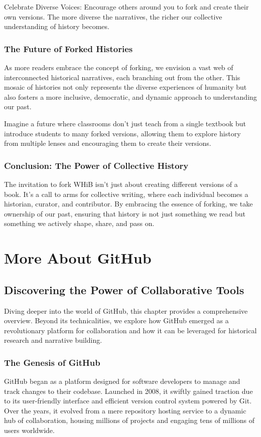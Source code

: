 \documentclass[a4paper,12pt]{book}
\begin{document}
Celebrate Diverse Voices: Encourage others around you to fork and create their own versions. The more diverse the narratives, the richer our collective understanding of history becomes.

\subsection*{The Future of Forked Histories}

As more readers embrace the concept of forking, we envision a vast web of interconnected historical narratives, each branching out from the other. This mosaic of histories not only represents the diverse experiences of humanity but also fosters a more inclusive, democratic, and dynamic approach to understanding our past.

Imagine a future where classrooms don't just teach from a single textbook but introduce students to many forked versions, allowing them to explore history from multiple lenses and encouraging them to create their versions.

\subsection*{Conclusion: The Power of Collective History}

The invitation to fork WHiB isn't just about creating different versions of a book. It's a call to arms for collective writing, where each individual becomes a historian, curator, and contributor. By embracing the essence of forking, we take ownership of our past, ensuring that history is not just something we read but something we actively shape, share, and pass on.

\chapter{More About GitHub}
\section*{Discovering the Power of Collaborative Tools}
Diving deeper into the world of GitHub, this chapter provides a comprehensive overview. Beyond its technicalities, we explore how GitHub emerged as a revolutionary platform for collaboration and how it can be leveraged for historical research and narrative building.

\subsection*{The Genesis of GitHub}
GitHub began as a platform designed for software developers to manage and track changes to their codebase. Launched in 2008, it swiftly gained traction due to its user-friendly interface and efficient version control system powered by Git. Over the years, it evolved from a mere repository hosting service to a dynamic hub of collaboration, housing millions of projects and engaging tens of millions of users worldwide.
\end{document}
